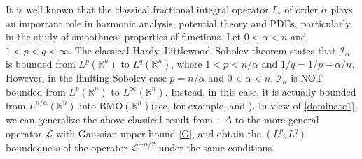 \documentclass[10pt, reqno]{amsart}
\theoremstyle{definition}
\theoremstyle{remark}
\numberwithin{equation}{section}
\begin{document}
It is well known that the classical fractional integral operator $I_{\alpha}$ of order $\alpha$ plays an important role in harmonic analysis, potential theory and PDEs, particularly in the study of smoothness properties of functions. Let $0<\alpha<n$ and $1<p<q<\infty$. The classical Hardy--Littlewood--Sobolev theorem states that $\mathcal{I}_{\alpha}$ is bounded from $L^p(\mathbb R^n)$ to $L^q(\mathbb R^n)$, where $1<p<n/{\alpha}$ and $1/q=1/p-\alpha/n$. However, in the limiting Sobolev case $p=n/{\alpha}$ and $0<\alpha<n$, $\mathcal{I}_{\alpha}$ is NOT bounded from $L^p(\mathbb R^n)$ to $L^{\infty}(\mathbb R^n)$. Instead, in this case, it is actually bounded from $L^{n/{\alpha}}(\mathbb R^n)$ into $\mathrm{BMO}(\mathbb R^n)$(see, for example, \cite{grafakos} and \cite{stein}). In view of \eqref{dominate1}, we can generalize the above classical result from $-\Delta$ to the more general operator $\mathcal{L}$ with Gaussian upper bound \eqref{G}, and obtain the $(L^p,L^q)$ boundedness of the operator $\mathcal L^{-\alpha/2}$ under the same conditions.
\end{document}
